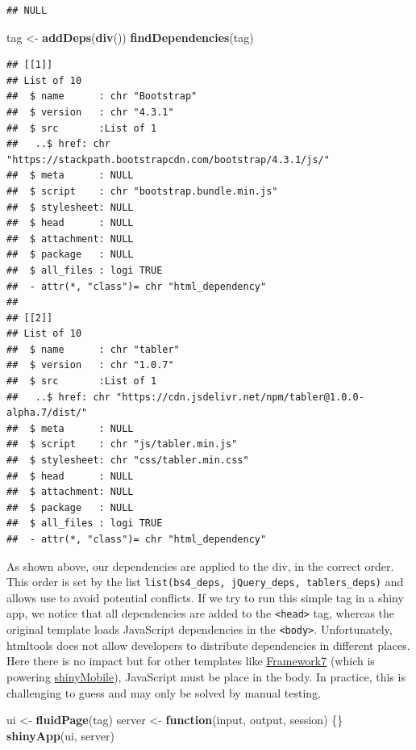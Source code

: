 \documentclass[
]{book}
\newenvironment{Shaded}{\begin{snugshade}}{\end{snugshade}}
\newcommand{\ControlFlowTok}[1]{\textcolor[rgb]{0.13,0.29,0.53}{\textbf{#1}}}
\newcommand{\KeywordTok}[1]{\textcolor[rgb]{0.13,0.29,0.53}{\textbf{#1}}}
\newcommand{\NormalTok}[1]{#1}
\newcommand{\StringTok}[1]{\textcolor[rgb]{0.31,0.60,0.02}{#1}}
\begin{document}
\begin{verbatim}
## NULL
\end{verbatim}

\begin{Shaded}
\begin{Highlighting}[]
\NormalTok{tag <-}\StringTok{ }\KeywordTok{addDeps}\NormalTok{(}\KeywordTok{div}\NormalTok{())}
\KeywordTok{findDependencies}\NormalTok{(tag)}
\end{Highlighting}
\end{Shaded}

\begin{verbatim}
## [[1]]
## List of 10
##  $ name      : chr "Bootstrap"
##  $ version   : chr "4.3.1"
##  $ src       :List of 1
##   ..$ href: chr "https://stackpath.bootstrapcdn.com/bootstrap/4.3.1/js/"
##  $ meta      : NULL
##  $ script    : chr "bootstrap.bundle.min.js"
##  $ stylesheet: NULL
##  $ head      : NULL
##  $ attachment: NULL
##  $ package   : NULL
##  $ all_files : logi TRUE
##  - attr(*, "class")= chr "html_dependency"
## 
## [[2]]
## List of 10
##  $ name      : chr "tabler"
##  $ version   : chr "1.0.7"
##  $ src       :List of 1
##   ..$ href: chr "https://cdn.jsdelivr.net/npm/tabler@1.0.0-alpha.7/dist/"
##  $ meta      : NULL
##  $ script    : chr "js/tabler.min.js"
##  $ stylesheet: chr "css/tabler.min.css"
##  $ head      : NULL
##  $ attachment: NULL
##  $ package   : NULL
##  $ all_files : logi TRUE
##  - attr(*, "class")= chr "html_dependency"
\end{verbatim}

As shown above, our dependencies are applied to the div, in the correct order. This order is set by the list \texttt{list(bs4\_deps,\ jQuery\_deps,\ tablers\_deps)} and allows use to avoid potential conflicts. If we try to run this simple tag in a shiny app, we notice that all dependencies are added to the \texttt{\textless{}head\textgreater{}} tag, whereas the original template loads JavaScript dependencies in the \texttt{\textless{}body\textgreater{}}. Unfortunately, htmltools does not allow developers to distribute dependencies in different places. Here there is no impact but for other templates like \href{https://framework7.io}{Framework7} (which is powering \href{https://github.com/RinteRface/shinyMobile}{shinyMobile}), JavaScript must be place in the body. In practice, this is challenging to guess and may only be solved by manual testing.

\begin{Shaded}
\begin{Highlighting}[]
\NormalTok{ui <-}\StringTok{ }\KeywordTok{fluidPage}\NormalTok{(tag)}
\NormalTok{server <-}\StringTok{ }\ControlFlowTok{function}\NormalTok{(input, output, session) \{\}}
\KeywordTok{shinyApp}\NormalTok{(ui, server)}
\end{Highlighting}
\end{Shaded}
\end{document}
